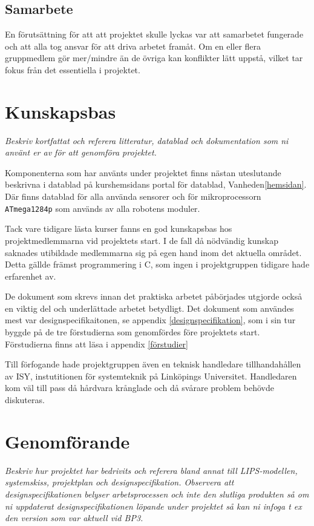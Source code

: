 \documentclass[11pt]{article}
\begin{document}
\begin{flushleft}
\subsection{Samarbete}
En förutsättning för att att projektet skulle lyckas var att samarbetet fungerade och att alla tog ansvar för att driva arbetet framåt. Om en eller flera gruppmedlem gör mer/mindre än de övriga kan konflikter lätt uppstå, vilket tar fokus från det essentiella i projektet.


\pagebreak

\section{Kunskapsbas}
\textit{Beskriv kortfattat och referera litteratur, datablad och dokumentation som ni använt er av för att genomföra projektet.}

Komponenterna som har använts under projektet finns nästan uteslutande beskrivna i datablad på kurshemsidans portal för datablad, Vanheden\ref{hemsidan}. Där finns datablad för alla använda sensorer och för mikroprocessorn \verb+ATmega1284p+ som används av alla robotens moduler.

Tack vare tidigare lästa kurser fanns en god kunskapsbas hos projektmedlemmarna vid projektets start. I de fall då nödvändig kunskap saknades utibildade medlemmarna sig på egen hand inom det aktuella området. Detta gällde främst programmering i C, som ingen i projektgruppen tidigare hade erfarenhet av. 

De dokument som skrevs innan det praktiska arbetet påbörjades utgjorde också en viktig del och underlättade arbetet betydligt. Det dokument som användes mest var designspecifikaitonen, se appendix \ref{designspecifikation}, som i sin tur byggde på de tre förstudierna som genomfördes före projektets start. Förstudierna finns att läsa i appendix \ref{förstudier}

Till förfogande hade projektgruppen även en teknisk handledare tillhandahållen av ISY, instutitionen för systemteknik på Linköpings Universitet. Handledaren kom väl till pass då hårdvara krånglade och då svårare problem behövde diskuteras.

\pagebreak

\section{Genomförande}
\textit{Beskriv hur projektet har bedrivits och referera bland annat till LIPS-modellen, systemskiss, projektplan och designspecifikation. Observera att designspecifikationen belyser arbetsprocessen och inte den slutliga produkten så om ni uppdaterat designspecifikationen löpande under projektet så kan ni infoga t ex den version som var aktuell vid BP3.}


\end{flushleft}
\end{document}
